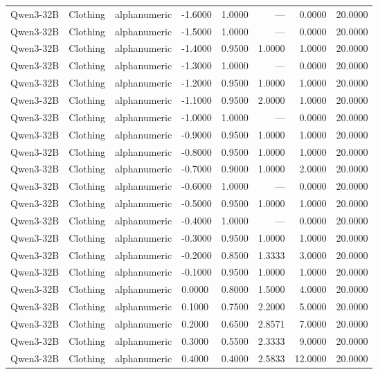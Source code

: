 \begin{table}
\begin{tabular}{llllrrrr}
Qwen3-32B & Clothing & alphanumeric & -1.6000 & 1.0000 & --- & 0.0000 & 20.0000 \\
Qwen3-32B & Clothing & alphanumeric & -1.5000 & 1.0000 & --- & 0.0000 & 20.0000 \\
Qwen3-32B & Clothing & alphanumeric & -1.4000 & 0.9500 & 1.0000 & 1.0000 & 20.0000 \\
Qwen3-32B & Clothing & alphanumeric & -1.3000 & 1.0000 & --- & 0.0000 & 20.0000 \\
Qwen3-32B & Clothing & alphanumeric & -1.2000 & 0.9500 & 1.0000 & 1.0000 & 20.0000 \\
Qwen3-32B & Clothing & alphanumeric & -1.1000 & 0.9500 & 2.0000 & 1.0000 & 20.0000 \\
Qwen3-32B & Clothing & alphanumeric & -1.0000 & 1.0000 & --- & 0.0000 & 20.0000 \\
Qwen3-32B & Clothing & alphanumeric & -0.9000 & 0.9500 & 1.0000 & 1.0000 & 20.0000 \\
Qwen3-32B & Clothing & alphanumeric & -0.8000 & 0.9500 & 1.0000 & 1.0000 & 20.0000 \\
Qwen3-32B & Clothing & alphanumeric & -0.7000 & 0.9000 & 1.0000 & 2.0000 & 20.0000 \\
Qwen3-32B & Clothing & alphanumeric & -0.6000 & 1.0000 & --- & 0.0000 & 20.0000 \\
Qwen3-32B & Clothing & alphanumeric & -0.5000 & 0.9500 & 1.0000 & 1.0000 & 20.0000 \\
Qwen3-32B & Clothing & alphanumeric & -0.4000 & 1.0000 & --- & 0.0000 & 20.0000 \\
Qwen3-32B & Clothing & alphanumeric & -0.3000 & 0.9500 & 1.0000 & 1.0000 & 20.0000 \\
Qwen3-32B & Clothing & alphanumeric & -0.2000 & 0.8500 & 1.3333 & 3.0000 & 20.0000 \\
Qwen3-32B & Clothing & alphanumeric & -0.1000 & 0.9500 & 1.0000 & 1.0000 & 20.0000 \\
Qwen3-32B & Clothing & alphanumeric & 0.0000 & 0.8000 & 1.5000 & 4.0000 & 20.0000 \\
Qwen3-32B & Clothing & alphanumeric & 0.1000 & 0.7500 & 2.2000 & 5.0000 & 20.0000 \\
Qwen3-32B & Clothing & alphanumeric & 0.2000 & 0.6500 & 2.8571 & 7.0000 & 20.0000 \\
Qwen3-32B & Clothing & alphanumeric & 0.3000 & 0.5500 & 2.3333 & 9.0000 & 20.0000 \\
Qwen3-32B & Clothing & alphanumeric & 0.4000 & 0.4000 & 2.5833 & 12.0000 & 20.0000 \\

\end{tabular}
\end{table}
